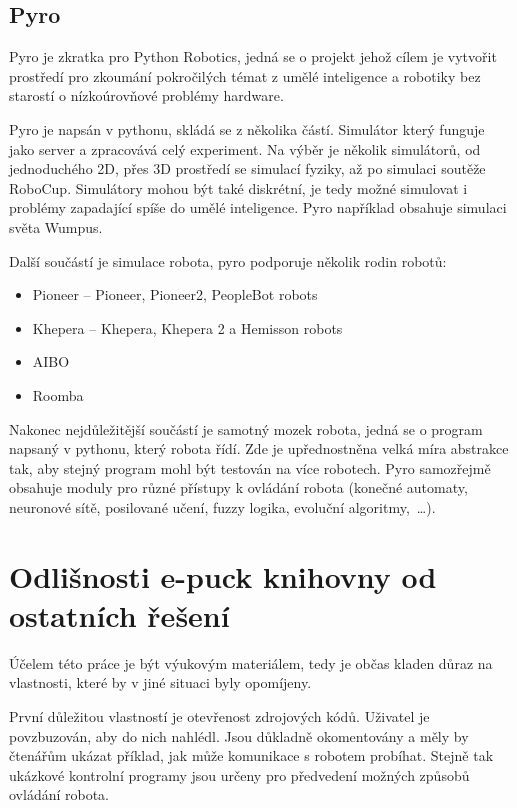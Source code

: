 \documentclass[12pt,notitlepage]{report}
\begin{document}
        \subsection{Pyro}
        \label{pyro}

        Pyro je zkratka pro Python Robotics, jedná se o projekt jehož cílem je
        vytvořit prostředí pro zkoumání pokročilých témat z umělé inteligence a
        robotiky bez starostí o nízkoúrovňové problémy hardware.

        Pyro je napsán v pythonu, skládá se z několika částí. Simulátor který
        funguje jako server a zpracovává celý experiment. Na výběr je několik
        simulátorů, od jednoduchého 2D, přes 3D prostředí se simulací fyziky,
        až po simulaci soutěže RoboCup. Simulátory mohou být také diskrétní, je
        tedy možné simulovat i problémy zapadající spíše do umělé inteligence.
        Pyro například obsahuje simulaci světa Wumpus\cite{aima}.

        Další součástí je simulace robota, pyro podporuje několik
        rodin robotů:

        \begin{itemize}
            \item Pioneer -- Pioneer, Pioneer2, PeopleBot robots
            \item Khepera -- Khepera, Khepera 2 a Hemisson robots
            \item AIBO
            \item Roomba
        \end{itemize}

        Nakonec nejdůležitější součástí je samotný mozek robota, jedná se o
        program napsaný v pythonu, který robota řídí. Zde je upřednostněna
        velká míra abstrakce tak, aby stejný program mohl být testován na více
        robotech. Pyro samozřejmě obsahuje moduly pro různé přístupy k ovládání
        robota (konečné automaty, neuronové sítě, posilované učení, fuzzy
        logika, evoluční algoritmy,~\ldots).

    \section{Odlišnosti e-puck knihovny od ostatních řešení}

    Účelem této práce je být výukovým materiálem, tedy je občas kladen důraz na
    vlastnosti, které by v jiné situaci byly opomíjeny.

    První důležitou vlastností je otevřenost zdrojových kódů. Uživatel je
    povzbuzován, aby do nich nahlédl. Jsou důkladně okomentovány a měly by
    čtenářům ukázat příklad, jak může komunikace s robotem probíhat. Stejně tak
    ukázkové kontrolní programy jsou určeny pro předvedení možných způsobů
    ovládání robota.
\end{document}
